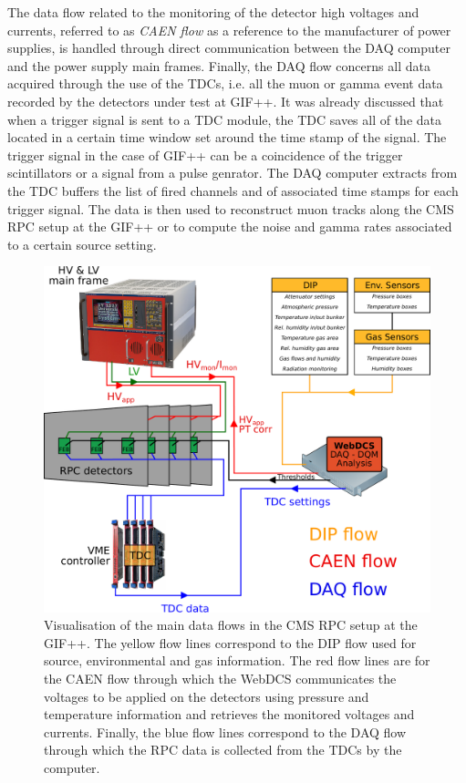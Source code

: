 	The data flow related to the monitoring of the detector high voltages and currents, referred to as \textit{CAEN flow} as a reference to the manufacturer of power supplies, is handled through direct communication between the DAQ computer and the power supply main frames. Finally, the DAQ flow concerns all data acquired through the use of the TDCs, i.e. all the muon or gamma event data recorded by the detectors under test at GIF++. It was already discussed that when a trigger signal is sent to a TDC module, the TDC saves all of the data located in a certain time window set around the time stamp of the signal. The trigger signal in the case of GIF++ can be a coincidence of the trigger scintillators or a signal from a pulse genrator. The DAQ computer extracts from the TDC buffers the list of fired channels and of associated time stamps for each trigger signal. The data is then used to reconstruct muon tracks along the CMS RPC setup at the GIF++ or to compute the noise and gamma rates associated to a certain source setting.

	\begin{figure}[H]
        \centering
		\includegraphics[width = 0.9\linewidth]{fig/chapt5/GIFpp-setup.pdf}
		\caption{\label{fig:dataflow} Visualisation of the main data flows in the CMS RPC setup at the GIF++. The yellow flow lines correspond to the DIP flow used for source, environmental and gas information. The red flow lines are for the CAEN flow through which the WebDCS communicates the voltages to be applied on the detectors using pressure and temperature information and retrieves the monitored voltages and currents. Finally, the blue flow lines correspond to the DAQ flow through which the RPC data is collected from the TDCs by the computer.}
	\end{figure}

